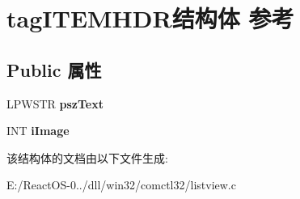 \hypertarget{structtag_i_t_e_m_h_d_r}{}\section{tag\+I\+T\+E\+M\+H\+D\+R结构体 参考}
\label{structtag_i_t_e_m_h_d_r}
\subsection*{Public 属性}
\begin{DoxyCompactItemize}
\item 
\mbox{\label{structtag_i_t_e_m_h_d_r_ac3aad0a87948a8017e9cabfae9bd4106}} 
L\+P\+W\+S\+TR {\bfseries psz\+Text}
\item 
\mbox{\label{structtag_i_t_e_m_h_d_r_af7c62741cc89706eda17ce99893b4afc}} 
I\+NT {\bfseries i\+Image}
\end{DoxyCompactItemize}


该结构体的文档由以下文件生成\+:\begin{DoxyCompactItemize}
\item 
E\+:/\+React\+O\+S-\/0../dll/win32/comctl32/listview.\+c\end{DoxyCompactItemize}
